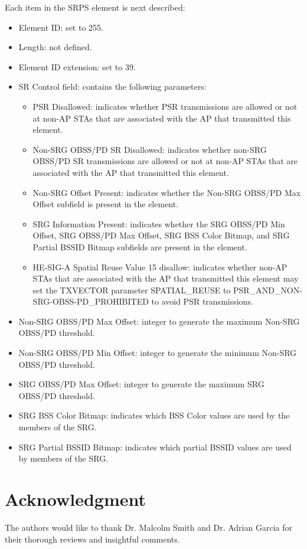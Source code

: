 \documentclass{ieeeaccess}
\begin{document}
Each item in the SRPS element is next described:
\begin{itemize}
	\item Element ID: set to 255.
	\item Length: not defined.
	\item Element ID extension: set to 39.
	\item SR Control field: contains the following parameters:
	\begin{itemize}
		\item PSR Disallowed: indicates whether PSR transmissions are allowed or not at non-AP STAs that are associated with the AP that transmitted this element.
		\item Non-SRG OBSS/PD SR Disallowed: indicates whether non-SRG OBSS/PD SR transmissions are allowed or not at non-AP STAs that are associated with the AP that transmitted this element.
		\item Non-SRG Offset Present: indicates whether the Non-SRG OBSS/PD Max Offset subfield is present in the element.
		\item SRG Information Present: indicates whether the SRG OBSS/PD Min Offset, SRG OBSS/PD Max Offset, SRG BSS Color Bitmap, and SRG Partial BSSID Bitmap subfields are present in the element.
		\item HE-SIG-A Spatial Reuse Value 15 disallow: indicates whether non-AP STAs that are associated with the AP that transmitted this element may set the TXVECTOR parameter SPATIAL\_REUSE to PSR\_AND\_NON-SRG-OBSS-PD\_PROHIBITED to avoid PSR transmissions.
	\end{itemize}
	\item Non-SRG OBSS/PD Max Offset: integer to generate the maximum Non-SRG OBSS/PD threshold.
	\item Non-SRG OBSS/PD Min Offset: integer to generate the minimum Non-SRG OBSS/PD threshold.
	\item SRG OBSS/PD Max Offset: integer to generate the maximum SRG OBSS/PD threshold.
	\item SRG BSS Color Bitmap: indicates which BSS Color values are used by the members of the SRG.
	\item SRG Partial BSSID Bitmap: indicates which partial BSSID values are used by members of the SRG.
\end{itemize}

\section*{Acknowledgment}
The authors would like to thank Dr. Malcolm Smith and Dr. Adrian Garcia for their thorough reviews and insightful comments.
\end{document}
